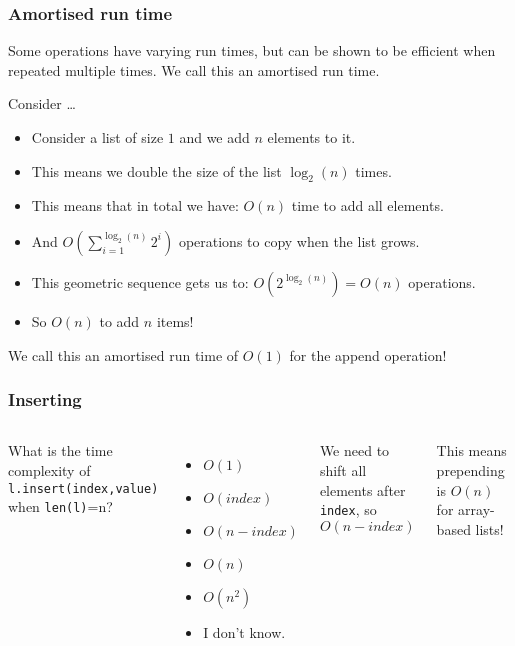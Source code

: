 \begin{frame}
	\frametitle{Amortised run time}
		Some operations have varying run times, but can be shown to be efficient when repeated multiple times. We call
		this an amortised run time.
	
Consider \ldots
		\begin{itemize}
			\item Consider a list of size $1$ and we add $n$ elements to it.
			\item This means we double the size of the list $\log_2(n)$ times.
			\item This means that in total we have: $O(n)$ time to add all elements.
			\item And $O\left(\sum\limits_{i=1}^{\log_2(n)} 2^i\right)$ operations to copy when the list grows.
			\item This geometric sequence gets us to: $O(2^{\log_2(n)}) = O(n)$ operations.
			\item So $O(n)$ to add $n$ items!
		\end{itemize}
		
		We call this an amortised run time of $O(1)$ for the append operation!
\end{frame}

\begin{frame}
	\frametitle{Inserting}
	\begin{columns}

			What is the time complexity of \texttt{l.insert(index,value)} when \texttt{len(l)}=n?
			
			\begin{itemize}
				\item $O(1)$
				\item $O(\textit{index})$
				\item $O(n - \textit{index})$
				\item $O(n)$
				\item $O(n^2)$
				\item I don't know.
			\end{itemize}
		
			We need to shift all elements after \texttt{index}, so $O(n-\textit{index})$
		
			This means prepending is $O(n)$ for array-based lists!
	\end{columns}
\end{frame}

